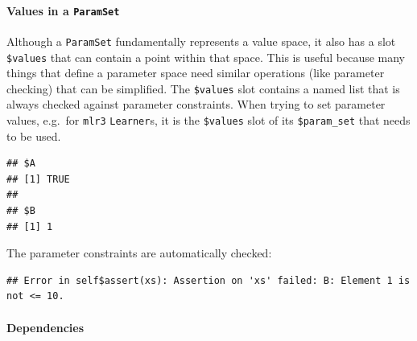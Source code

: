 \documentclass[
]{scrbook}
\newenvironment{Shaded}{\begin{snugshade}}{\end{snugshade}}
\newcommand{\AttributeTok}[1]{\textcolor[rgb]{0.77,0.63,0.00}{#1}}
\newcommand{\ConstantTok}[1]{\textcolor[rgb]{0.00,0.00,0.00}{#1}}
\newcommand{\DecValTok}[1]{\textcolor[rgb]{0.00,0.00,0.81}{#1}}
\newcommand{\FunctionTok}[1]{\textcolor[rgb]{0.00,0.00,0.00}{#1}}
\newcommand{\NormalTok}[1]{#1}
\newcommand{\OtherTok}[1]{\textcolor[rgb]{0.56,0.35,0.01}{#1}}
\newcommand{\SpecialCharTok}[1]{\textcolor[rgb]{0.00,0.00,0.00}{#1}}
\renewenvironment{Shaded} {\begin{snugshade}\small} {\end{snugshade}}
\begin{document}
\hypertarget{values-in-a-paramset}{%
\paragraph{\texorpdfstring{Values in a \texttt{ParamSet}}{Values in a ParamSet}}\label{values-in-a-paramset}}

Although a \texttt{ParamSet} fundamentally represents a value space, it also has a slot \texttt{\$values} that can contain a point within that space.
This is useful because many things that define a parameter space need similar operations (like parameter checking) that can be simplified.
The \texttt{\$values} slot contains a named list that is always checked against parameter constraints.
When trying to set parameter values, e.g.~for \texttt{mlr3} \texttt{Learner}s, it is the \texttt{\$values} slot of its \texttt{\$param\_set} that needs to be used.

\begin{Shaded}
\end{Shaded}

\begin{verbatim}
## $A
## [1] TRUE
## 
## $B
## [1] 1
\end{verbatim}

The parameter constraints are automatically checked:

\begin{Shaded}
\end{Shaded}

\begin{verbatim}
## Error in self$assert(xs): Assertion on 'xs' failed: B: Element 1 is not <= 10.
\end{verbatim}

\hypertarget{dependencies}{%
\paragraph{Dependencies}\label{dependencies}}
\end{document}
